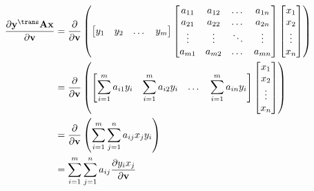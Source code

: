 \begin{align}
    \dfrac{\partial \mathbf{y}^\trans \mathbf{A} \mathbf{x}}{\partial \mathbf{v}} &= \dfrac{\partial}{\partial \mathbf{v}} \left(
    \begin{bmatrix}
        y_{1} & y_{2} & \dots & y_{m}
    \end{bmatrix}
    \begin{bmatrix}
        a_{11} & a_{12} & \dots & a_{1n} \\
        a_{21} & a_{22} & \dots & a_{2n} \\
        \vdots & \vdots & \ddots & \vdots \\
        a_{m1} & a_{m2} & \dots & a_{mn} \\
    \end{bmatrix} \begin{bmatrix}
        x_{1} \\ x_{2} \\ \vdots \\ x_{n}
    \end{bmatrix} \right) \\
    &= \dfrac{\partial}{\partial \mathbf{v}} \left(
			\begin{bmatrix}
				\displaystyle \sum_{i = 1}^{m} a_{i1}y_{i} & 
				\displaystyle \sum_{i = 1}^{m} a_{i2}y_{i} & 
				\dots & 
				\displaystyle \sum_{i = 1}^{m} a_{in}y_{i}
			\end{bmatrix} \begin{bmatrix}
				x_{1} \\ x_{2} \\ \vdots \\ x_{n}
			\end{bmatrix} \right) \\
    &= \dfrac{\partial}{\partial \mathbf{v}} \left(
        \sum_{i = 1}^{m}\sum_{j = 1}^{n} a_{ij} x_{j} y_{i}
    \right) \\
    &= \sum_{i = 1}^{m}\sum_{j = 1}^{n} a_{ij} \dfrac{\partial y_{i}x_{j}}{\partial \mathbf{v}} %
\end{align}
